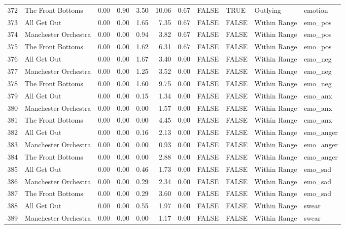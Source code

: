 \begin{table}[ht]
\begin{tabular}{rlrrrrrllll}
  372 & The Front Bottoms & 0.00 & 0.90 & 3.50 & 10.06 & 0.67 & FALSE & TRUE & Outlying & emotion \\ 
  373 & All Get Out & 0.00 & 0.00 & 1.65 & 7.35 & 0.67 & FALSE & FALSE & Within Range & emo\_pos \\ 
  374 & Manchester Orchestra & 0.00 & 0.00 & 0.94 & 3.82 & 0.67 & FALSE & FALSE & Within Range & emo\_pos \\ 
  375 & The Front Bottoms & 0.00 & 0.00 & 1.62 & 6.31 & 0.67 & FALSE & FALSE & Within Range & emo\_pos \\ 
  376 & All Get Out & 0.00 & 0.00 & 1.67 & 3.40 & 0.00 & FALSE & FALSE & Within Range & emo\_neg \\ 
  377 & Manchester Orchestra & 0.00 & 0.00 & 1.25 & 3.52 & 0.00 & FALSE & FALSE & Within Range & emo\_neg \\ 
  378 & The Front Bottoms & 0.00 & 0.00 & 1.60 & 9.75 & 0.00 & FALSE & FALSE & Within Range & emo\_neg \\ 
  379 & All Get Out & 0.00 & 0.00 & 0.15 & 1.34 & 0.00 & FALSE & FALSE & Within Range & emo\_anx \\ 
  380 & Manchester Orchestra & 0.00 & 0.00 & 0.00 & 1.57 & 0.00 & FALSE & FALSE & Within Range & emo\_anx \\ 
  381 & The Front Bottoms & 0.00 & 0.00 & 0.00 & 4.45 & 0.00 & FALSE & FALSE & Within Range & emo\_anx \\ 
  382 & All Get Out & 0.00 & 0.00 & 0.16 & 2.13 & 0.00 & FALSE & FALSE & Within Range & emo\_anger \\ 
  383 & Manchester Orchestra & 0.00 & 0.00 & 0.00 & 0.93 & 0.00 & FALSE & FALSE & Within Range & emo\_anger \\ 
  384 & The Front Bottoms & 0.00 & 0.00 & 0.00 & 2.88 & 0.00 & FALSE & FALSE & Within Range & emo\_anger \\ 
  385 & All Get Out & 0.00 & 0.00 & 0.46 & 1.73 & 0.00 & FALSE & FALSE & Within Range & emo\_sad \\ 
  386 & Manchester Orchestra & 0.00 & 0.00 & 0.29 & 2.34 & 0.00 & FALSE & FALSE & Within Range & emo\_sad \\ 
  387 & The Front Bottoms & 0.00 & 0.00 & 0.29 & 3.60 & 0.00 & FALSE & FALSE & Within Range & emo\_sad \\ 
  388 & All Get Out & 0.00 & 0.00 & 0.55 & 1.97 & 0.00 & FALSE & FALSE & Within Range & swear \\ 
  389 & Manchester Orchestra & 0.00 & 0.00 & 0.00 & 1.17 & 0.00 & FALSE & FALSE & Within Range & swear \\ 

\end{tabular}
\end{table}
